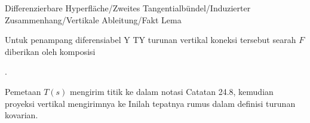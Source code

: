 {Differenzierbare Hyperfläche/Zweites Tangentialbündel/Induzierter Zusammenhang/Vertikale Ableitung/Fakt}
{Lema}
{}
{

\faktzusatz {}
\faktzusatz {}

}
{

Untuk penampang diferensiabel
 { Y } { TY
} {}
turunan vertikal koneksi tersebut searah $F$ diberikan oleh komposisi

 { . }

Pemetaan $T(s)$ mengirim titik
 ke
 dalam notasi
Catatan 24.8,
kemudian proyeksi vertikal mengirimnya ke
Inilah tepatnya rumus dalam definisi turunan kovarian.

}
